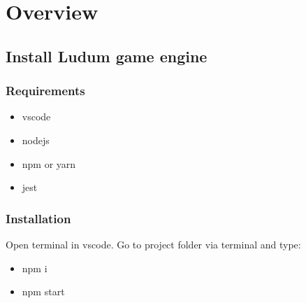 
\chapter{Overview}
\section{Install Ludum game engine}

\subsection{Requirements}

\begin{itemize}
	\item vscode
    \item nodejs
    \item npm or yarn
    \item jest
\end{itemize}


\subsection{Installation}

Open terminal in vscode. Go to project folder via terminal and type:

\begin{itemize}
	\item npm i
    \item npm start
\end{itemize}